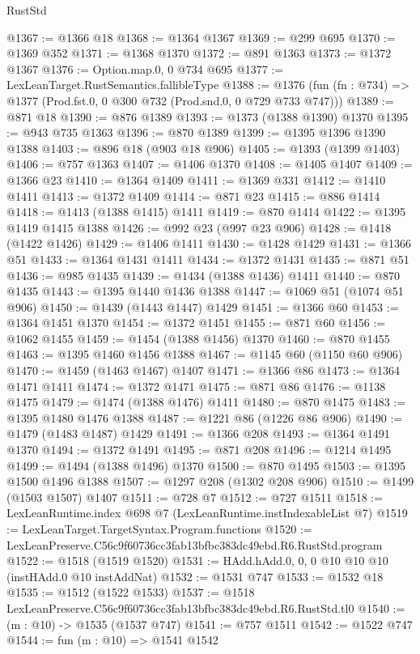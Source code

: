\begin{lexlean}{RustStd}
\begin{coremodule}
@1367 := @1366 @18
@1368 := @1364 @1367
@1369 := @299 @695
@1370 := @1369 @352
@1371 := @1368 @1370
@1372 := @891 @1363
@1373 := @1372 @1367
@1376 := Option.map.{0, 0} @734 @695
@1377 := LexLeanTarget.RustSemantics.fallibleType
@1388 := @1376
    (fun (fn : @734) => @1377 (Prod.fst.{0, 0} @300 @732 (Prod.snd.{0, 0} @729 @733 @747)))
@1389 := @871 @18
@1390 := @876 @1389
@1393 := @1373 (@1388 @1390) @1370
@1395 := @943 @735 @1363
@1396 := @870 @1389
@1399 := @1395 @1396 @1390 @1388
@1403 := @896 @18 (@903 @18 @906)
@1405 := @1393 (@1399 @1403)
@1406 := @757 @1363
@1407 := @1406 @1370
@1408 := @1405 @1407
@1409 := @1366 @23
@1410 := @1364 @1409
@1411 := @1369 @331
@1412 := @1410 @1411
@1413 := @1372 @1409
@1414 := @871 @23
@1415 := @886 @1414
@1418 := @1413 (@1388 @1415) @1411
@1419 := @870 @1414
@1422 := @1395 @1419 @1415 @1388
@1426 := @992 @23 (@997 @23 @906)
@1428 := @1418 (@1422 @1426)
@1429 := @1406 @1411
@1430 := @1428 @1429
@1431 := @1366 @51
@1433 := @1364 @1431 @1411
@1434 := @1372 @1431
@1435 := @871 @51
@1436 := @985 @1435
@1439 := @1434 (@1388 @1436) @1411
@1440 := @870 @1435
@1443 := @1395 @1440 @1436 @1388
@1447 := @1069 @51 (@1074 @51 @906)
@1450 := @1439 (@1443 @1447) @1429
@1451 := @1366 @60
@1453 := @1364 @1451 @1370
@1454 := @1372 @1451
@1455 := @871 @60
@1456 := @1062 @1455
@1459 := @1454 (@1388 @1456) @1370
@1460 := @870 @1455
@1463 := @1395 @1460 @1456 @1388
@1467 := @1145 @60 (@1150 @60 @906)
@1470 := @1459 (@1463 @1467) @1407
@1471 := @1366 @86
@1473 := @1364 @1471 @1411
@1474 := @1372 @1471
@1475 := @871 @86
@1476 := @1138 @1475
@1479 := @1474 (@1388 @1476) @1411
@1480 := @870 @1475
@1483 := @1395 @1480 @1476 @1388
@1487 := @1221 @86 (@1226 @86 @906)
@1490 := @1479 (@1483 @1487) @1429
@1491 := @1366 @208
@1493 := @1364 @1491 @1370
@1494 := @1372 @1491
@1495 := @871 @208
@1496 := @1214 @1495
@1499 := @1494 (@1388 @1496) @1370
@1500 := @870 @1495
@1503 := @1395 @1500 @1496 @1388
@1507 := @1297 @208 (@1302 @208 @906)
@1510 := @1499 (@1503 @1507) @1407
@1511 := @728 @7
@1512 := @727 @1511
@1518 := LexLeanRuntime.index @698 @7 (LexLeanRuntime.instIndexableList @7)
@1519 := LexLeanTarget.TargetSyntax.Program.functions
@1520 := LexLeanPreserve.C56c9f60736cc3fab13bfbc383dc49ebd.R6.RustStd.program
@1522 := @1518 (@1519 @1520)
@1531 := HAdd.hAdd.{0, 0, 0} @10 @10 @10 (instHAdd.{0} @10 instAddNat)
@1532 := @1531 @747
@1533 := @1532 @18
@1535 := @1512 (@1522 @1533)
@1537 := @1518 LexLeanPreserve.C56c9f60736cc3fab13bfbc383dc49ebd.R6.RustStd.tl0
@1540 := (m : @10) -> @1535 (@1537 @747)
@1541 := @757 @1511
@1542 := @1522 @747
@1544 := fun (m : @10) => @1541 @1542

\end{coremodule}
\end{lexlean}
